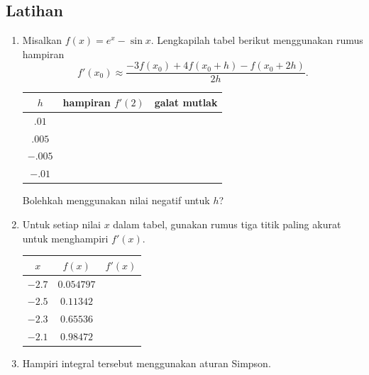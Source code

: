 \begin{small} 

\newpage{}

\subsection{Latihan}
\begin{enumerate}
\item Misalkan $f(x)=e^{x}-\sin x$. Lengkapilah tabel berikut menggunakan
rumus hampiran
\[
f'(x_{0})\approx\frac{-3f(x_{0})+4f(x_{0}+h)-f(x_{0}+2h)}{2h}.
\]

\begin{center}
\begin{tabular}{c|c|c}
$h$ & hampiran $f'(2)$ & galat mutlak\tabularnewline
\hline 
$.01$ &  & \tabularnewline
$.005$ &  & \tabularnewline
$-.005$ &  & \tabularnewline
$-.01$ &  & \tabularnewline
\end{tabular}
\par\end{center}

Bolehkah menggunakan nilai negatif untuk $h$?
\item \label{exc:calculusErrors-4} Untuk setiap nilai $x$ dalam tabel,
gunakan rumus tiga titik paling akurat untuk menghampiri $f'(x)$. \hasananswer 

\begin{center}
\begin{tabular}{c|c|c}
$x$ & $f(x)$ & $f'(x)$\tabularnewline
\hline 
$-2.7$ & $0.054797$ & \tabularnewline
$-2.5$ & $0.11342$ & \tabularnewline
$-2.3$ & $0.65536$ & \tabularnewline
$-2.1$ & $0.98472$ & \tabularnewline
\end{tabular}
\par\end{center}
\item \label{exc:calculusErrors}Hampiri integral tersebut menggunakan aturan
Simpson.


\end{enumerate}
\end{small}

